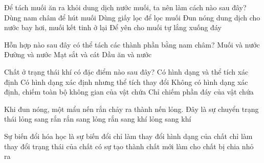 \documentclass[FileMain.tex]{subfiles}
\begin{document}
\begin{ex}%
Để tách muối ăn ra khỏi dung dịch nước muối, ta nên làm cách nào sau đây?
\choice
{Dùng nam châm để hút muối}
{Dùng giấy lọc để lọc muối}
{\True Đun nóng dung dịch cho nước bay hơi, muối kết tinh ở lại}
{Để yên cho muối tự lắng xuống đáy}
\end{ex}

\begin{ex}%
Hỗn hợp nào sau đây có thể tách các thành phần bằng nam châm?
\choice
{Muối và nước}
{Đường và nước}
{\True Mạt sắt và cát}
{Dầu ăn và nước}
\end{ex}

\begin{ex}%
Chất ở trạng thái khí có đặc điểm nào sau đây?
\choice
{Có hình dạng và thể tích xác định}
{Có hình dạng xác định nhưng thể tích thay đổi}
{\True Không có hình dạng xác định, chiếm toàn bộ không gian của vật chứa}
{Chỉ chiếm phần đáy của vật chứa}
\end{ex}

\begin{ex}%
Khi đun nóng, một mẩu nến rắn chảy ra thành nến lỏng. Đây là sự chuyển trạng thái
\choice
{lỏng sang rắn}
{\True rắn sang lỏng}
{rắn sang khí}
{lỏng sang khí}
\end{ex}

\begin{ex}%
Sự biến đổi hóa học là sự biến đổi
\choice
{chỉ làm thay đổi hình dạng của chất}
{chỉ làm thay đổi trạng thái của chất}
{\True có sự tạo thành chất mới}
{làm cho chất bị chia nhỏ ra}
\end{ex}
\end{document}
